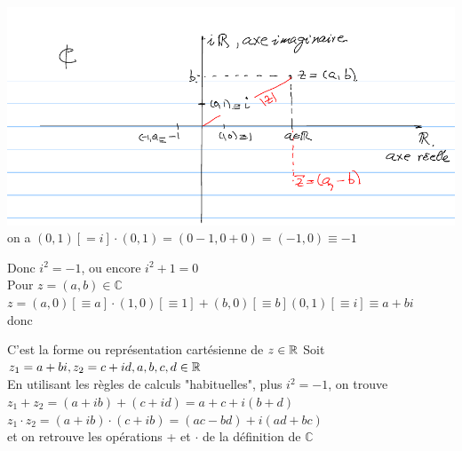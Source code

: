 \documentclass[12pt,a4paper]{article}
\begin{document}
{\includegraphics[scale=0.7]{illustrations_Analyse/axes_complexe}
on a $(0,1) [=i] \cdot (0,1) = (0-1, 0+0) = (-1,0) \equiv -1$
\\
\begin{center}
\end{center}

Donc $i^2 = -1$, ou encore $i^2 + 1 = 0$\\
Pour $z = (a,b) \in \mathbb{C}$\\
$z = (a,0)[\equiv a]\cdot(1,0)[\equiv 1] + (b,0)[\equiv b](0,1)[\equiv i] \equiv a +bi$
\\donc
\begin{center}
\end{center}
C'est la forme ou représentation cartésienne de $z \in \mathbb{R}$
Soit $z_1 = a +bi, z_2 = c+id, a,b,c,d \in \mathbb{R}$\\
En utilisant les règles de calculs "habituelles", plus $i^2 = -1$, on trouve\\
$z_1 + z_2 = (a+ib)+(c+id) = a+c+i(b+d)$\\
$z_1\cdot z_2 = (a+ib) \cdot (c+ib) = (ac-bd)+i(ad+bc)$\\
et on retrouve les opérations + et $\cdot$ de la définition de $\mathbb{C}$
}
\end{document}
